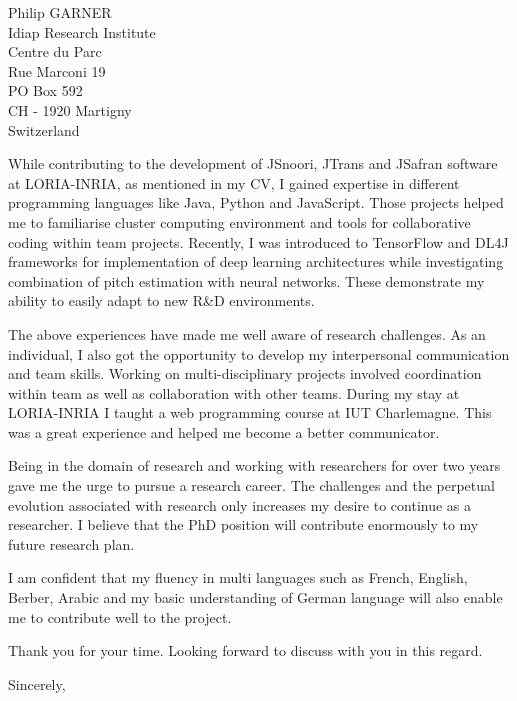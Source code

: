 \documentclass[
	pagenumber=false, %
	parskip=half, %
	fromalign=right, %
	foldmarks=true, %
	addrfield=true %
	]{scrlttr2}
\begin{document}
\begin{letter}{Philip GARNER \\ Idiap Research Institute\\ Centre du Parc \\ Rue Marconi 19  \\ PO Box 592 \\CH - 1920 Martigny \\Switzerland}
		
		While contributing to the development of JSnoori, JTrans and J\-Safran software at LORIA\--INRIA, as mentioned in my CV, I gained expertise in different programming languages like Java, Python and JavaScript. Those projects helped me to familiarise  cluster computing environment	and tools for collaborative coding within team projects. Recently, I was introduced to TensorFlow and DL4J frameworks for implementation of deep learning architectures while investigating combination of pitch estimation with  neural networks. These demonstrate my ability to easily adapt to new R\&D environments.    
		
		The above experiences have made me well aware of  research challenges. As an individual, I also got the opportunity to develop my interpersonal communication and team 		
skills. Working on multi-disciplinary projects involved coordination within  team as well as collaboration with other teams. During my stay at LORIA\--INRIA I taught a web programming course at IUT Charlemagne. This was a great experience and helped me become a better communicator. 

	Being in the domain of research and working  with researchers for over two years gave me the urge to pursue a research career. The challenges and the perpetual evolution associated  with research only increases my desire to continue as a researcher. I believe that the PhD position will contribute enormously to my future research plan. 
	
	I am confident that my fluency in multi languages such as French, English, Berber, Arabic and my basic understanding of German language  will also enable me to contribute well to the project.
 
	Thank you for your time. Looking forward to discuss with you in this regard.
	
\closing{Sincerely,}



\end{letter}
 
\end{document}
